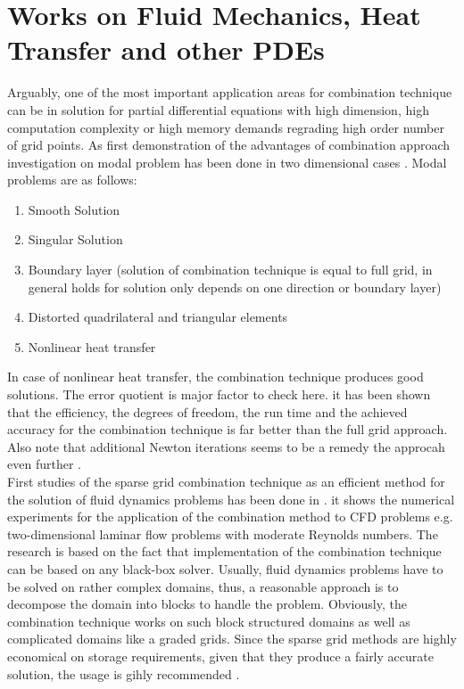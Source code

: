 \section{Works on Fluid Mechanics, Heat Transfer and other PDEs} 
Arguably, one of the most important application areas for combination technique can be in solution for partial differential equations with high dimension, high computation complexity or high memory demands regrading high order number of grid points. As first demonstration of the advantages of combination approach investigation on modal problem has been done in two dimensional cases \cite{Griebel1992b}. Modal problems are as follows:
\begin{enumerate}
\item Smooth Solution
\item Singular Solution
\item Boundary layer (solution of combination technique is equal to full grid, in general holds for solution only depends on one direction or boundary layer)
\item Distorted quadrilateral and triangular elements
\item Nonlinear heat transfer
\end{enumerate}
In case of nonlinear heat transfer, the combination technique produces good solutions. The error quotient is major factor to check here. it has been shown that the efficiency, the degrees of freedom, the run time and the achieved accuracy for the combination technique is far better than the full grid approach. Also note that additional Newton iterations seems to be a remedy the approcah even further \cite{Griebel1992b}.\\
First studies of the sparse grid combination technique as an efficient method for the solution of fluid dynamics problems has been done in \cite{Griebel1995}. it shows the numerical experiments for the application of the combination method to CFD problems e.g. two-dimensional laminar flow problems with moderate Reynolds numbers. The research is based on the fact that implementation of the combination technique can be based on any black-box solver. Usually, fluid dynamics problems have to be solved on rather complex domains, thus, a reasonable approach is to decompose the domain into blocks to handle the problem. Obviously, the combination technique works on such block structured domains as well as complicated domains like a graded grids. Since the sparse grid methods are highly economical on storage requirements, given that they produce a fairly accurate solution, the usage is gihly recommended \cite{Griebel1995}.\\
